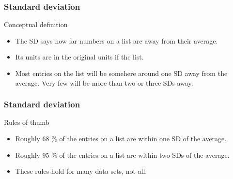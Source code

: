 \documentclass[handout]{beamer}
\begin{document}

   \begin{frame} \frametitle{Standard deviation}

   \begin{block}
   {Conceptual definition}

   \begin{itemize}
   \item    The SD says how far numbers on a list are away from their
   average.
   \item Its units are in the original units if the list.

   \item Most entries on the list will be somehere around one SD
   away from the average. Very few will be more than two or three SDs away.
   \end{itemize}

   \end{block}
   \end{frame}


   \begin{frame} \frametitle{Standard deviation}

   \begin{block}
   {Rules of thumb}

   \begin{itemize}
   \item  Roughly 68 \% of the entries on a list are within one SD of the average.
   \item  Roughly 95 \% of the entries on a list are within two SDs of the average.
   \item These rules hold for many data sets, not all.
   \end{itemize}
   \end{block}
   \end{frame}

\end{document}
